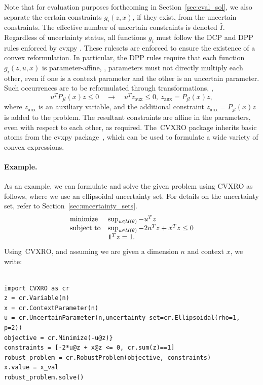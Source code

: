 Note that for evaluation purposes forthcoming in Section~\ref{sec:eval_sol}, we also separate the certain constraints $g_i(z,x)$, if they exist, from the uncertain constraints. The effective number of uncertain constraints is denoted $\hat{I}$.
Regardless of uncertainty status, all functions $g_i$ must
follow the \gls{DCP} and \gls{DPP} rules enforced by cvxpy \cite{diamond2016cvxpy}. These rulesets are enforced to ensure the existence of a convex reformulation. 
In particular, the \gls{DPP} rules require that each function $g_i(z,u,x)$ is parameter-affine, \ie, parameters must not directly multiply each other, even if one is a context parameter and the other is an uncertain parameter. Such occurrences are to be reformulated through transformations, \ie, $$u^TP_{jl}(x)z \leq 0 \quad \rightarrow \quad u^Tz_{\text{aux}} \leq 0,~z_{\text{aux}} =P_{jl}(x)z,$$
where $z_{\text{aux}}$ is an auxiliary variable, and the additional constraint $z_{\text{aux}} =P_{jl}(x)z$ is added to the problem. The resultant constraints are affine in the parameters, even with respect to each other, as required. 
The~\gls{CVXRO} package inherits basic atoms from the cvxpy package~\cite{diamond2016cvxpy}, which can be used to formulate a wide variety of convex expressions. 

\paragraph{Example.} As an example, we can formulate and solve the given problem using \gls{CVXRO} as follows, where we use an ellipsoidal uncertainty set. For details on the uncertainty set, refer to Section~\ref{sec:uncertainty_sets}. 
\begin{equation*}
         \begin{array}[t]{ll}
		\mbox{minimize}  & \sup_{u \in {\mathcal{U}}(\theta)} -u^Tz \\
		\mbox{subject to} & \sup_{u \in {\mathcal{U}}(\theta)} -2u^Tz + x^Tz  \le 0\\
        & \mathbf 1^Tz =1.
	\end{array}
\end{equation*}
Using~\gls{CVXRO}, and assuming we are given a dimension $n$ and context $x$, we write:
\begin{listing}[H]
	\begin{verbatim}
    
import CVXRO as cr 
z = cr.Variable(n)
x = cr.ContextParameter(n)
u = cr.UncertainParameter(n,uncertainty_set=cr.Ellipsoidal(rho=1, p=2))
objective = cr.Minimize(-u@z)}
constraints = [-2*u@z + x@z <= 0, cr.sum(z)==1]
robust_problem = cr.RobustProblem(objective, constraints)
x.value = x_val
robust_problem.solve()
\end{verbatim}
\caption{CVXRO example}
\end{listing}

